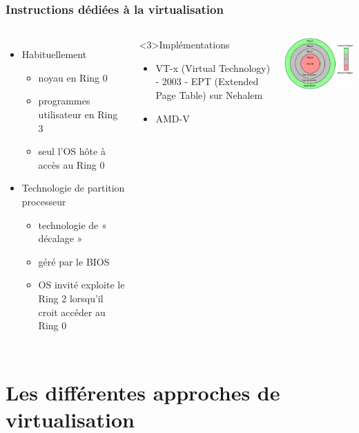 \begin{frame}
\frametitle{Instructions dédiées à la virtualisation}
\begin{columns}
\begin{itemize}
  \item Habituellement
  \begin{itemize}
  \item noyau en Ring 0
  \item programmes utilisateur en Ring 3
  \item seul l'OS hôte à accès au Ring 0
\end{itemize}
  \item <2->Technologie de partition processeur 
\begin{itemize}
  \item technologie de « décalage »
  \item géré par le BIOS
  \item OS invité exploite le Ring 2 lorsqu'il croit accéder au Ring 0
\end{itemize}
\end{itemize}

\begin{exampleblock}<3>{Implémentations}
\begin{itemize}
  \item VT-x (Virtual Technology) - 2003 - EPT (Extended Page Table) sur Nehalem
  \item AMD-V
\end{itemize}
\end{exampleblock}

\includegraphics[width=7cm]{../illustration/cpu-ring-model.png}
\end{columns}
\end{frame}



\section{Les différentes approches de virtualisation}

